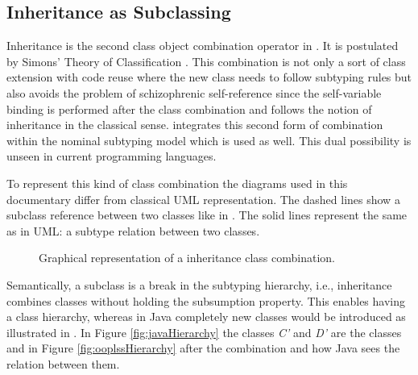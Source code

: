 %
%

\subsection{Inheritance as Subclassing}
Inheritance is the second class object combination operator in
\ooplss. It is postulated by Simons' Theory of Classification
\cite{simons_theory_2004-2}. This combination is not only a sort of class
extension with code reuse where the new class needs to follow subtyping
rules but also avoids the problem of schizophrenic self-reference since
the self-variable binding is performed after the class combination
and follows the notion of inheritance in the classical sense. \ooplss
integrates this second form of combination within the nominal subtyping
model which is used as well. This dual possibility is unseen in current
programming languages.

To represent this kind of class combination the diagrams used in
this documentary differ from classical UML representation. The
dashed lines show a subclass reference between two classes like in
. The solid lines represent the same as
in UML: a subtype relation between two classes.

\begin{figure}
	\centering
	\caption{Graphical representation of a inheritance class combination.}
	\label{fig:subclassCombination}
\end{figure}

Semantically, a subclass is a break in the subtyping hierarchy,
i.e., inheritance combines classes without holding the subsumption
property. This enables \ooplss having a class hierarchy,
whereas in Java completely new classes would be introduced as illustrated
in . In Figure \ref{fig:javaHierarchy} the
classes \emph{C'} and \emph{D'} are the classes \C and \D in Figure
\ref{fig:ooplssHierarchy} after the combination and how Java sees the
relation between them.

